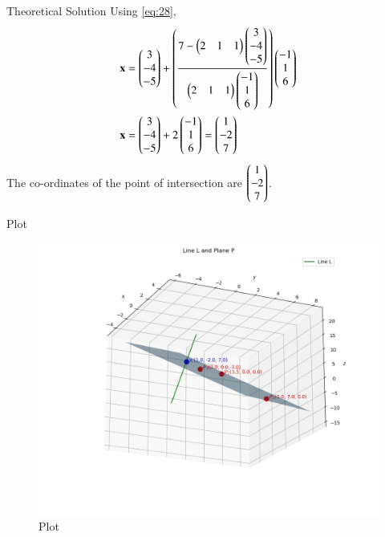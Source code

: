 \documentclass{beamer}
\begin{document}
\begin{frame}{Theoretical Solution}
Using \eqref{eq:28},
\begin{align}
    \mathbf{x} &= \begin{pmatrix}3 \\ -4 \\ -5\end{pmatrix} + \left(\frac{7 - \begin{pmatrix}2 & 1 & 1\end{pmatrix}\begin{pmatrix}3 \\ -4 \\ -5\end{pmatrix}}{\begin{pmatrix}2 & 1 & 1\end{pmatrix}\begin{pmatrix}-1 \\ 1 \\ 6\end{pmatrix}}\right)\begin{pmatrix}-1 \\ 1 \\ 6\end{pmatrix} \\
    \mathbf{x} &= \begin{pmatrix}3 \\ -4 \\ -5\end{pmatrix} + 2\begin{pmatrix}-1 \\ 1 \\ 6\end{pmatrix} = \begin{pmatrix}1 \\ -2 \\ 7\end{pmatrix}
\end{align}
The co-ordinates of the point of intersection are $\begin{pmatrix}1 \\ -2 \\ 7\end{pmatrix}$.
\end{frame}

\begin{frame}{Plot}
    \begin{figure}
        \centering
        \includegraphics[width=0.7\columnwidth]{../figs/plot_c.jpg}
        \caption{Plot}
        \label{fig:fig}
    \end{figure}
\end{frame}
\end{document}
